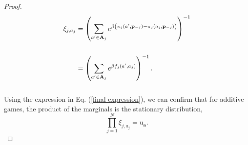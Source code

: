 \documentclass[11pt]{article}
\theoremstyle{plainCl1}
\theoremstyle{plainCl2}
\newcommand{\A}{\mathbf{A}}
\newcommand{\abf}{\mathbf{a}}
\newcommand{\pbf}{\mathbf{p}}
\begin{document}
\begin{proof}
\begin{align}
\xi_{j,a_j} &= \left( \sum_{a' \in \A_j} \displaystyle e^{\beta \left( \pi_j(a',\pbf_{-j}) - \pi_j(a_j,\pbf_{-j})\right)} \right)^{-1}\\ \notag \\
\label{final-expression}
&=  \left( \sum_{a' \in \A_j} \displaystyle e^{\beta f_j(a',a_j)} \right)^{-1} .
\end{align} \\
\noindent Using the expression in Eq. (\ref{final-expression}), we can confirm that for additive games, the product of the marginals is the stationary distribution,  
\begin{equation}
\prod_{j=1}^N \xi_{j,a_j} = \mathrm{u}_\abf .
\end{equation} 
\end{proof}
\end{document}
